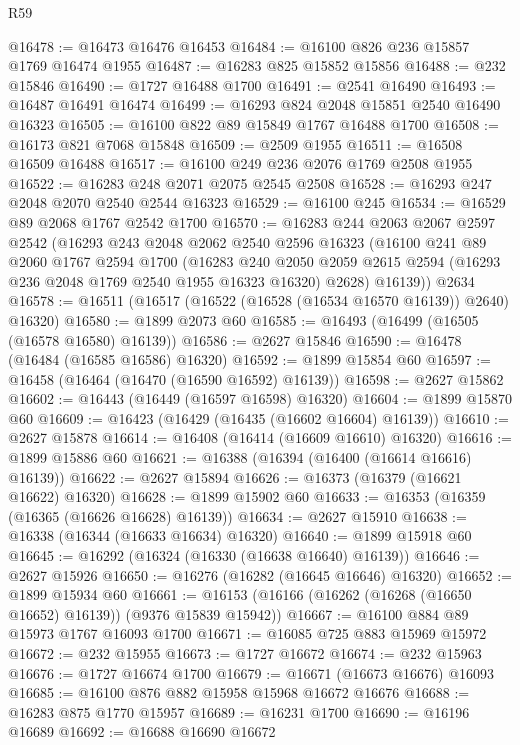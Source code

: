 \begin{lexlean}{R59}
\begin{coremodule}
@16478 := @16473 @16476 @16453
@16484 := @16100 @826 @236 @15857 @1769 @16474 @1955
@16487 := @16283 @825 @15852 @15856
@16488 := @232 @15846
@16490 := @1727 @16488 @1700
@16491 := @2541 @16490
@16493 := @16487 @16491 @16474
@16499 := @16293 @824 @2048 @15851 @2540 @16490 @16323
@16505 := @16100 @822 @89 @15849 @1767 @16488 @1700
@16508 := @16173 @821 @7068 @15848
@16509 := @2509 @1955
@16511 := @16508 @16509 @16488
@16517 := @16100 @249 @236 @2076 @1769 @2508 @1955
@16522 := @16283 @248 @2071 @2075 @2545 @2508
@16528 := @16293 @247 @2048 @2070 @2540 @2544 @16323
@16529 := @16100 @245
@16534 := @16529 @89 @2068 @1767 @2542 @1700
@16570 := @16283
    @244
    @2063
    @2067
    @2597
    @2542
    (@16293
      @243
      @2048
      @2062
      @2540
      @2596
      @16323
      (@16100
        @241
        @89
        @2060
        @1767
        @2594
        @1700
        (@16283
          @240
          @2050
          @2059
          @2615
          @2594
          (@16293 @236 @2048 @1769 @2540 @1955 @16323 @16320)
          @2628)
        @16139))
    @2634
@16578 := @16511 (@16517 (@16522 (@16528 (@16534 @16570 @16139)) @2640) @16320)
@16580 := @1899 @2073 @60
@16585 := @16493 (@16499 (@16505 (@16578 @16580) @16139))
@16586 := @2627 @15846
@16590 := @16478 (@16484 (@16585 @16586) @16320)
@16592 := @1899 @15854 @60
@16597 := @16458 (@16464 (@16470 (@16590 @16592) @16139))
@16598 := @2627 @15862
@16602 := @16443 (@16449 (@16597 @16598) @16320)
@16604 := @1899 @15870 @60
@16609 := @16423 (@16429 (@16435 (@16602 @16604) @16139))
@16610 := @2627 @15878
@16614 := @16408 (@16414 (@16609 @16610) @16320)
@16616 := @1899 @15886 @60
@16621 := @16388 (@16394 (@16400 (@16614 @16616) @16139))
@16622 := @2627 @15894
@16626 := @16373 (@16379 (@16621 @16622) @16320)
@16628 := @1899 @15902 @60
@16633 := @16353 (@16359 (@16365 (@16626 @16628) @16139))
@16634 := @2627 @15910
@16638 := @16338 (@16344 (@16633 @16634) @16320)
@16640 := @1899 @15918 @60
@16645 := @16292 (@16324 (@16330 (@16638 @16640) @16139))
@16646 := @2627 @15926
@16650 := @16276 (@16282 (@16645 @16646) @16320)
@16652 := @1899 @15934 @60
@16661 := @16153 (@16166 (@16262 (@16268 (@16650 @16652) @16139)) (@9376 @15839 @15942))
@16667 := @16100 @884 @89 @15973 @1767 @16093 @1700
@16671 := @16085 @725 @883 @15969 @15972
@16672 := @232 @15955
@16673 := @1727 @16672
@16674 := @232 @15963
@16676 := @1727 @16674 @1700
@16679 := @16671 (@16673 @16676) @16093
@16685 := @16100 @876 @882 @15958 @15968 @16672 @16676
@16688 := @16283 @875 @1770 @15957
@16689 := @16231 @1700
@16690 := @16196 @16689
@16692 := @16688 @16690 @16672

\end{coremodule}
\end{lexlean}
